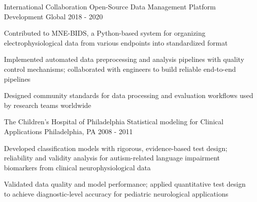 \begin{cventries}
    \cventry
      {International Collaboration} %
      {Open-Source Data Management Platform Development} %
      {Global} %
      {2018 - 2020} %
      {
        \begin{cvitems} %
          \item {Contributed to MNE-BIDS, a Python-based system for organizing electrophysiological data from various endpoints into standardized format}
          \item {Implemented automated data preprocessing and analysis pipelines with quality control mechanisms; collaborated with engineers to build reliable end-to-end pipelines}
          \item {Designed community standards for data processing and evaluation workflows used by research teams worldwide}
        \end{cvitems}
      }

    \cventry
      {The Children's Hospital of Philadelphia} %
      {Statistical modeling for Clinical Applications} %
      {Philadelphia, PA} %
      {2008 - 2011} %
      {
        \begin{cvitems} %
          \item {Developed classification models with rigorous, evidence-based test design; reliability and validity analysis for autism-related language impairment biomarkers from clinical neurophysiological data}
          \item {Validated data quality and model performance; applied quantitative test design to achieve diagnostic-level accuracy for pediatric neurological applications}
        \end{cvitems}
      }

  \end{cventries}
